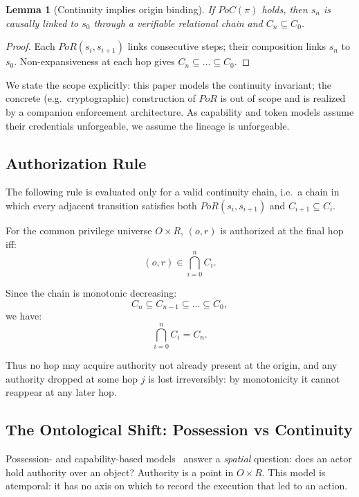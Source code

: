 \documentclass[11pt]{article}
\newtheorem{lemma}{Lemma}
\begin{document}
\begin{lemma}[Continuity implies origin binding]
If $PoC(\pi)$ holds, then $s_n$ is causally linked to $s_0$ through a verifiable
relational chain and $C_n \subseteq C_0$.
\end{lemma}

\begin{proof}
Each $PoR(s_i,s_{i+1})$ links consecutive steps; their composition links $s_n$
to $s_0$. Non-expansiveness at each hop gives $C_n \subseteq \dots \subseteq
C_0$.
\end{proof}

We state the scope explicitly: this paper models the continuity invariant; the
concrete (e.g.\ cryptographic) construction of $PoR$ is out of scope and is
realized by a companion enforcement architecture. As capability and token models
assume their credentials unforgeable, we assume the lineage is unforgeable.

\subsection{Authorization Rule}

The following rule is evaluated only for a valid continuity chain, i.e.\ a chain
in which every adjacent transition satisfies both $PoR(s_i,s_{i+1})$ and
$C_{i+1}\subseteq C_i$.

For the common privilege universe $O \times R$, $(o,r)$ is authorized at the
final hop iff:
\[
(o,r) \in \bigcap_{i=0}^{n} C_i.
\]

Since the chain is monotonic decreasing:
\[
C_n \subseteq C_{n-1} \subseteq \dots \subseteq C_0,
\]
we have:
\[
\bigcap_{i=0}^{n} C_i = C_n.
\]

Thus no hop may acquire authority not already present at the origin, and any
authority dropped at some hop $j$ is lost irreversibly: by monotonicity it cannot
reappear at any later hop.

\subsection{The Ontological Shift: Possession vs Continuity}

Possession- and capability-based models~\cite{dennis1966programming,miller2003capability}
answer a \emph{spatial}
question: does an actor hold authority over an object? Authority is a point in
$O \times R$. This model is atemporal: it has no axis on which to record the
execution that led to an action.
\end{document}
